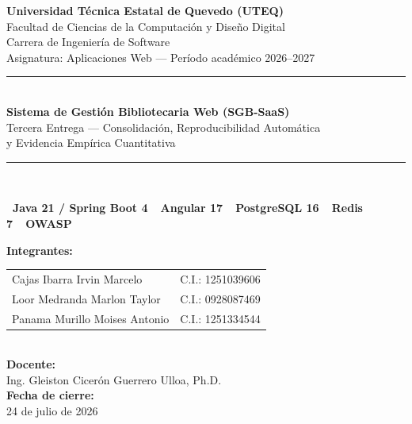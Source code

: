 \documentclass[12pt,a4paper]{article}
\newcommand{\badgeJAVA}{\colorbox{javacolor}{\color{white}\small\bfseries\ Java 21 / Spring Boot 4\ }}
\newcommand{\badgeSQL}{\colorbox{sqlcolor}{\color{white}\small\bfseries\ PostgreSQL 16\ }}
\newcommand{\badgeOWASP}{\colorbox{verdeuteq}{\color{white}\small\bfseries\ OWASP\ }}
\newcommand{\badgeANGULAR}{\colorbox{angularcolor}{\color{white}\small\bfseries\ Angular 17\ }}
\newcommand{\badgeREDIS}{\colorbox{owaspborder}{\color{white}\small\bfseries\ Redis 7\ }}
\begin{document}
\thispagestyle{empty}
\begin{titlepage}
\centering
\vspace*{1cm}

{\large\bfseries Universidad Técnica Estatal de Quevedo (UTEQ)}\\[0.2cm]
{\normalsize Facultad de Ciencias de la Computación y Diseño Digital}\\[0.1cm]
{\normalsize Carrera de Ingeniería de Software}\\[0.1cm]
{\normalsize Asignatura: Aplicaciones Web --- Período académico 2026--2027}\\[1.5cm]

\rule{0.8\linewidth}{1pt}\\[0.4cm]
{\Large\bfseries\color{verdeuteq} Sistema de Gestión Bibliotecaria Web (SGB-SaaS)}\\[0.3cm]
{\large Tercera Entrega --- Consolidación, Reproducibilidad Automática\\ y Evidencia Empírica Cuantitativa}\\[0.4cm]
\rule{0.8\linewidth}{1pt}\\[1cm]

\begin{center}
\badgeJAVA\quad\badgeANGULAR\quad\badgeSQL\quad\badgeREDIS\quad\badgeOWASP
\end{center}

\vspace{1cm}

{\normalsize\bfseries Integrantes:}\\[0.2cm]
\begin{tabular}{ll}
Cajas Ibarra Irvin Marcelo & C.I.: 1251039606 \\
Loor Medranda Marlon Taylor & C.I.: 0928087469 \\
Panama Murillo Moises Antonio & C.I.: 1251334544 \\
\end{tabular}\\[1cm]

{\normalsize\bfseries Docente:}\\
Ing. Gleiston Cicerón Guerrero Ulloa, Ph.D.\\[1cm]

{\normalsize\bfseries Fecha de cierre:}\\
24 de julio de 2026\\[1cm]


\end{titlepage}
\end{document}
